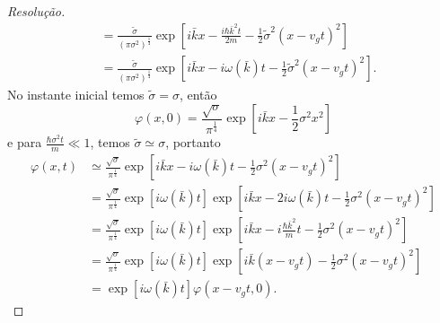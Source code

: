 \begin{proof}[Resolução]
\begin{align*}
                     &= \frac{\tilde{\sigma}}{(\pi \sigma^2)^{\frac14}} \exp\left[i\bar{k}x - \frac{i\hbar\bar{k}^2 t}{2m} - \frac{1}{2}\tilde{\sigma}^2(x - v_g t)^2\right]\\
                     &= \frac{\tilde{\sigma}}{(\pi \sigma^2)^{\frac14}}\exp\left[i\bar{k}x - i\omega(\bar{k})t - \frac12 \tilde{\sigma}^2 (x - v_gt)^2\right].
    \end{align*}
    No instante inicial temos \(\tilde{\sigma} = \sigma\), então
    \begin{equation*}
        \varphi(x,0) = \frac{\sqrt{\sigma}}{\pi^{\frac14}} \exp\left[i\bar{k}x - \frac12 \sigma^2 x^2\right]
    \end{equation*}
    e para \(\frac{\hbar \sigma^2 t}{m} \ll 1\), temos \(\tilde{\sigma} \simeq \sigma\), portanto
    \begin{align*}
        \varphi(x, t) &\simeq \frac{\sqrt{\sigma}}{\pi^{\frac14}} \exp\left[i \bar{k}x - i \omega(\bar{k})t - \frac12 \sigma^2 (x - v_g t)^2\right] \\
                      &= \frac{\sqrt{\sigma}}{\pi^{\frac14}} \exp\left[i\omega(\bar{k})t\right]\exp\left[i \bar{k}x - 2i \omega(\bar{k})t - \frac12 \sigma^2 (x - v_g t)^2\right]\\
                      &= \frac{\sqrt{\sigma}}{\pi^{\frac14}} \exp\left[i\omega(\bar{k})t\right]\exp\left[i \bar{k}x - i \frac{\hbar \bar{k}^2}{m}t - \frac12 \sigma^2 (x - v_g t)^2\right]\\
                      &= \frac{\sqrt{\sigma}}{\pi^{\frac14}} \exp\left[i\omega(\bar{k})t\right]\exp\left[i \bar{k}(x - v_gt) - \frac12 \sigma^2 (x - v_g t)^2\right]\\
                      &= \exp\left[i\omega(\bar{k})t\right]\varphi(x-v_g t, 0).
    \end{align*}


\end{proof}
